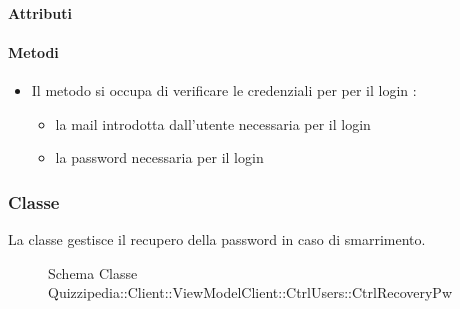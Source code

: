\paragraph{Attributi}
\paragraph{Metodi}
\begin{itemize}
\item {}
\newline
Il metodo si occupa di verificare le credenziali per per il login
\newline
{} :
\begin{itemize}
\item {}
\newline
la mail introdotta dall'utente necessaria per il login
\item {}
\newline
la password necessaria per il login
\end{itemize}
\end{itemize}
\subsubsection{Classe }
La classe gestisce il recupero della password in caso di smarrimento.
\begin{figure}[H]
\centering
\noindent{}
\caption[Schema Classe CtrlRecoveryPw]{Schema Classe Quizzipedia::Client::ViewModelClient::CtrlUsers::CtrlRecoveryPw}
\end{figure}
